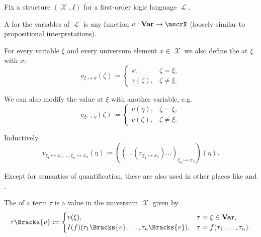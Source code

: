 \begin{definition}\label{def:first_order_valuation}
  Fix a structure \( (\mscrX, I) \) for a first-order logic language \( \mscrL \).

  \begin{thmenum}
     A  for the variables of \( \mscrL \) is any function \( v: \boldop{Var} \to \mscrX \) (loosely similar to \hyperref[def:propositional_valuation/interpretation]{propositional interpretations}).

     For every variable \( \xi \) and every universum element \( x \in \mscrX \) we also define the  at \( \xi \) with \( x \):
    \begin{equation*}
      v_{\xi \mapsto x}(\zeta) \coloneqq \begin{cases}
        x,        &\zeta = \xi, \\
        v(\zeta), &\zeta \neq \xi.
      \end{cases}
    \end{equation*}

    We can also modify the value at \( \xi \) with another variable, e.g.
    \begin{equation*}
      v_{\xi \mapsto \eta}(\zeta) \coloneqq \begin{cases}
        v(\eta),  &\zeta = \xi, \\
        v(\zeta), &\zeta \neq \xi.
      \end{cases}
    \end{equation*}

    Inductively\IND,
    \begin{equation*}
      v_{\xi_1 \mapsto x_1, \ldots, \xi_n \mapsto x_n}(\eta) \coloneqq ((\ldots(v_{\xi_1 \mapsto x_1})\ldots)_{\xi_n \mapsto x_n})(\eta).
    \end{equation*}

    Except for semantics of quantification, these are also used in other places like  and .

     The  of a term \( \tau \) is a value in the universum \( \mscrX \) given by
    \begin{equation}\label{eq:def:first_order_valuation/term_valuation}
      \tau\Bracks{v} \coloneqq \begin{cases}
        v(\xi),                                           &\tau = \xi \in \boldop{Var}, \\
        I(f)(\tau_1\Bracks{v}, \ldots, \tau_n\Bracks{v}), &\tau = f(\tau_1, \ldots, \tau_n).
      \end{cases}
    \end{equation}


\end{thmenum}
\end{definition}
